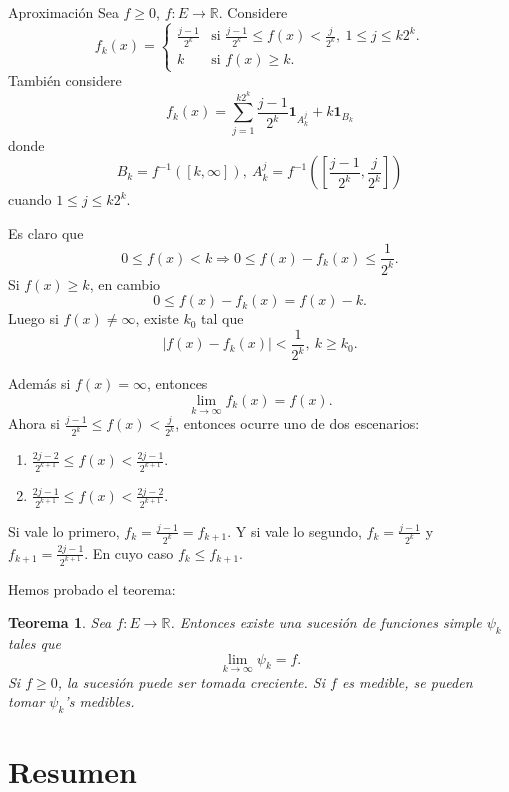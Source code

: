 \documentclass[utf8]{beamer}
\theoremstyle{plain}
\newtheorem{Th}{Teorema}               %
\theoremstyle{definition}
\theoremstyle{remark}
\numberwithin{equation}{section}
\newcommand{\bR}{\mathbb{R}}    %
\newcommand{\bonj}[1]{\left\lbrack#1\right\rbrack}
\renewcommand{\geq}{\geqslant}          %
\renewcommand{\leq}{\leqslant}          %
\newcommand{\To}{\Rightarrow}
\newcommand{\ind}{\mathbf{1}}       %
\renewcommand{\.}{\Cdot}                %
\begin{document}
\begin{frame}{Aproximación}
  Sea $f\geq 0$, $f:E\to\bR$. Considere
  $$
  f_k(x)=\begin{cases}
    \frac{j-1}{2^k}&\text{si }\frac{j-1}{2^k}\leq f(x)<\frac{j}{2^k},\ 1\leq j\leq k2^k.\\
    k&\text{si }f(x)\geq k.
  \end{cases}
  $$
  También considere 
  $$f_k(x)=\sum_{j=1}^{k2^k}\frac{j-1}{2^k}\ind_{A^j_k}+k\ind_{B_k}$$
  donde 
  $$B_k=f^{-1}(\bonj{k,\infty}),\ A_k^j=f^{-1}\left(\bonj{\frac{j-1}{2^k},\frac{j}{2^k}}\right)$$
  cuando $1\leq j\leq k2^k$.
\end{frame}

\begin{frame}
  Es claro que 
  $$0\leq f(x)<k\To 0\leq f(x)-f_k(x)\leq \frac{1}{2^k}.$$
  Si $f(x)\geq k$, en cambio 
  $$0\leq f(x)-f_k(x)=f(x)-k.$$
  Luego si $f(x)\neq \infty$, existe $k_0$ tal que 
  $$|f(x)-f_k(x)|<\frac{1}{2^k},\ k\geq k_0.$$
\end{frame}

\begin{frame}
Además si $f(x)=\infty$, entonces 
$$\lim_{k\to\infty}f_k(x)=f(x).$$
Ahora si $\frac{j-1}{2^k}\leq f(x)<\frac{j}{2^k}$, entonces ocurre uno de dos escenarios:
\begin{enumerate}[(1)]
  \item $\frac{2j-2}{2^{k+1}}\leq f(x)<\frac{2j-1}{2^{k+1}}$.
  \item $\frac{2j-1}{2^{k+1}}\leq f(x)<\frac{2j-2}{2^{k+1}}$.%
\end{enumerate}
Si vale lo primero, $f_k=\frac{j-1}{2^k}=f_{k+1}$. Y si vale lo segundo, $f_k=\frac{j-1}{2^k}$ y $f_{k+1}=\frac{2j-1}{2^{k+1}}$. En cuyo caso $f_k\leq f_{k+1}$.
\end{frame}

\begin{frame}
  Hemos probado el teorema:
  \begin{Th}\label{th:Aprox}
    Sea $f:E\to\bR$. Entonces existe una sucesión de funciones simple $\psi_k$ tales que 
    $$\lim_{k\to\infty}\psi_k=f.$$
    Si $f\geq 0$, la sucesión puede ser tomada creciente. Si $f$ es medible, se pueden tomar $\psi_k$'s medibles.
  \end{Th}
\end{frame}
\section*{Resumen}
\end{document}
